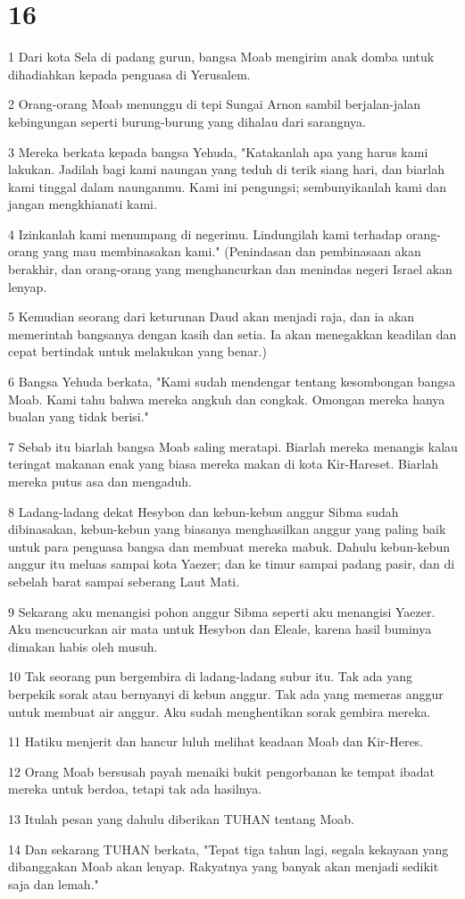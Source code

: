 \chapter{16}

\par 1 Dari kota Sela di padang gurun, bangsa Moab mengirim anak domba untuk dihadiahkan kepada penguasa di Yerusalem.
\par 2 Orang-orang Moab menunggu di tepi Sungai Arnon sambil berjalan-jalan kebingungan seperti burung-burung yang dihalau dari sarangnya.
\par 3 Mereka berkata kepada bangsa Yehuda, "Katakanlah apa yang harus kami lakukan. Jadilah bagi kami naungan yang teduh di terik siang hari, dan biarlah kami tinggal dalam naunganmu. Kami ini pengungsi; sembunyikanlah kami dan jangan mengkhianati kami.
\par 4 Izinkanlah kami menumpang di negerimu. Lindungilah kami terhadap orang-orang yang mau membinasakan kami." (Penindasan dan pembinasaan akan berakhir, dan orang-orang yang menghancurkan dan menindas negeri Israel akan lenyap.
\par 5 Kemudian seorang dari keturunan Daud akan menjadi raja, dan ia akan memerintah bangsanya dengan kasih dan setia. Ia akan menegakkan keadilan dan cepat bertindak untuk melakukan yang benar.)
\par 6 Bangsa Yehuda berkata, "Kami sudah mendengar tentang kesombongan bangsa Moab. Kami tahu bahwa mereka angkuh dan congkak. Omongan mereka hanya bualan yang tidak berisi."
\par 7 Sebab itu biarlah bangsa Moab saling meratapi. Biarlah mereka menangis kalau teringat makanan enak yang biasa mereka makan di kota Kir-Hareset. Biarlah mereka putus asa dan mengaduh.
\par 8 Ladang-ladang dekat Hesybon dan kebun-kebun anggur Sibma sudah dibinasakan, kebun-kebun yang biasanya menghasilkan anggur yang paling baik untuk para penguasa bangsa dan membuat mereka mabuk. Dahulu kebun-kebun anggur itu meluas sampai kota Yaezer; dan ke timur sampai padang pasir, dan di sebelah barat sampai seberang Laut Mati.
\par 9 Sekarang aku menangisi pohon anggur Sibma seperti aku menangisi Yaezer. Aku mencucurkan air mata untuk Hesybon dan Eleale, karena hasil buminya dimakan habis oleh musuh.
\par 10 Tak seorang pun bergembira di ladang-ladang subur itu. Tak ada yang berpekik sorak atau bernyanyi di kebun anggur. Tak ada yang memeras anggur untuk membuat air anggur. Aku sudah menghentikan sorak gembira mereka.
\par 11 Hatiku menjerit dan hancur luluh melihat keadaan Moab dan Kir-Heres.
\par 12 Orang Moab bersusah payah menaiki bukit pengorbanan ke tempat ibadat mereka untuk berdoa, tetapi tak ada hasilnya.
\par 13 Itulah pesan yang dahulu diberikan TUHAN tentang Moab.
\par 14 Dan sekarang TUHAN berkata, "Tepat tiga tahun lagi, segala kekayaan yang dibanggakan Moab akan lenyap. Rakyatnya yang banyak akan menjadi sedikit saja dan lemah."

